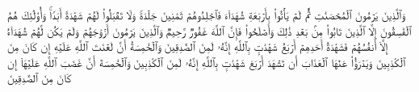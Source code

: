 \stopbuffer%
\startbuffer[\q:24:4]
وَٱلَّذِینَ یَرۡمُونَ ٱلۡمُحۡصَنَٰتِ ثُمَّ لَمۡ یَأۡتُوا۟ بِأَرۡبَعَةِ شُهَدَاۤءَ فَٱجۡلِدُوهُمۡ ثَمَٰنِینَ جَلۡدَةࣰ وَلَا تَقۡبَلُوا۟ لَهُمۡ شَهَٰدَةً أَبَدࣰاۚ وَأُو۟لَٰۤئِكَ هُمُ ٱلۡفَٰسِقُونَ%
\stopbuffer%
\startbuffer[\q:24:5]
إِلَّا ٱلَّذِینَ تَابُوا۟ مِنۢ بَعۡدِ ذَٰلِكَ وَأَصۡلَحُوا۟ فَإِنَّ ٱللَّهَ غَفُورࣱ رَّحِیمࣱ%
\stopbuffer%
\startbuffer[\q:24:6]
وَٱلَّذِینَ یَرۡمُونَ أَزۡوَٰجَهُمۡ وَلَمۡ یَكُن لَّهُمۡ شُهَدَاۤءُ إِلَّاۤ أَنفُسُهُمۡ فَشَهَٰدَةُ أَحَدِهِمۡ أَرۡبَعُ شَهَٰدَٰتِۭ بِٱللَّهِ إِنَّهُۥ لَمِنَ ٱلصَّٰدِقِینَ%
\stopbuffer%
\startbuffer[\q:24:7]
وَٱلۡخَٰمِسَةُ أَنَّ لَعۡنَتَ ٱللَّهِ عَلَیۡهِ إِن كَانَ مِنَ ٱلۡكَٰذِبِینَ%
\stopbuffer%
\startbuffer[\q:24:8]
وَیَدۡرَؤُا۟ عَنۡهَا ٱلۡعَذَابَ أَن تَشۡهَدَ أَرۡبَعَ شَهَٰدَٰتِۭ بِٱللَّهِ إِنَّهُۥ لَمِنَ ٱلۡكَٰذِبِینَ%
\stopbuffer%
\startbuffer[\q:24:9]
وَٱلۡخَٰمِسَةَ أَنَّ غَضَبَ ٱللَّهِ عَلَیۡهَاۤ إِن كَانَ مِنَ ٱلصَّٰدِقِینَ%
\stopbuffer%
